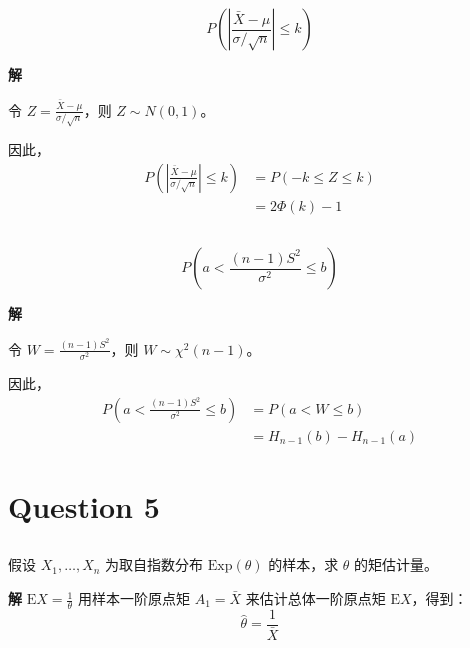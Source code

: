 \documentclass[12pt,a4paper]{article}
\begin{document}
\subsection{}
    \[
        P\!\left(\left|\frac{\bar{X}-\mu}{\sigma/\sqrt{n}}\right| \le k\right)
    \]

\begin{answerbox}
\textbf{解}  

令 $Z = \frac{\bar{X}-\mu}{\sigma/\sqrt{n}}$，则 $Z \sim N(0,1)$。

  因此，
  \begin{align*}
    P\!\left(\left|\frac{\bar{X}-\mu}{\sigma/\sqrt{n}}\right| \le k\right) &= P(-k \le Z \le k) \\
    &= 2\Phi(k) - 1
  \end{align*}
\end{answerbox}

\subsection{}
    \[
        P\!\left(a < \frac{(n-1)S^2}{\sigma^2} \le b\right)
    \]

\begin{answerbox}
\textbf{解}  

令 $W = \frac{(n-1)S^2}{\sigma^2}$，则 $W \sim \chi^2(n-1)$。

  因此，
  \begin{align*}
    P\!\left(a < \frac{(n-1)S^2}{\sigma^2} \le b\right) &= P(a < W \le b) \\
    &= H_{n-1}(b) - H_{n-1}(a)
  \end{align*}
\end{answerbox}

\section{Question 5}

\subsection{}

假设 $X_1,\ldots,X_n$ 为取自指数分布 $\mathrm{Exp}(\theta)$ 的样本，求 $\theta$ 的矩估计量。

\begin{answerbox}
\textbf{解}  
  $\mathrm{E}X = \frac{1}{\theta}$
  用样本一阶原点矩 $A_1 = \bar{X}$ 来估计总体一阶原点矩 $\mathrm{E}X$，得到：
  $$\hat{\theta} = \frac{1}{\bar{X}}$$
\end{answerbox}
\end{document}
